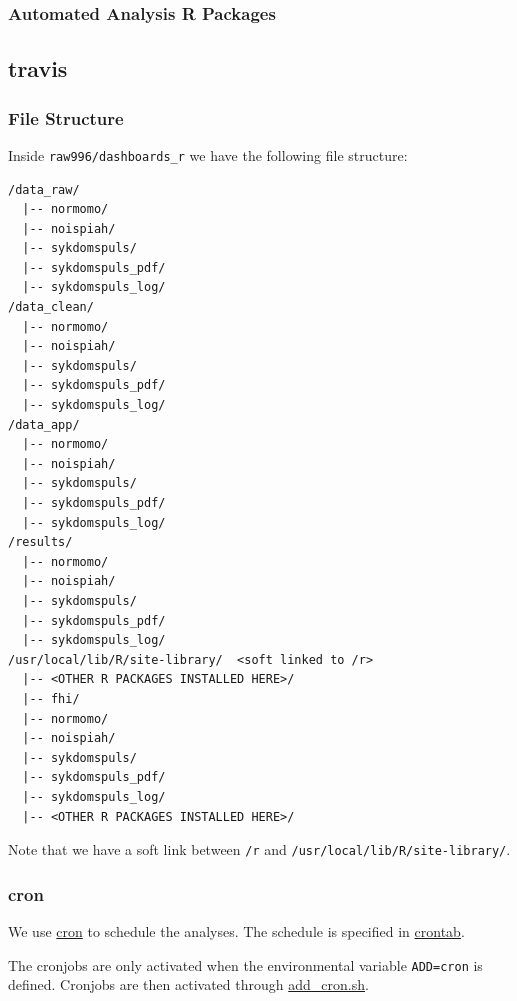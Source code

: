 \documentclass[12pt,]{article}
\begin{document}
\subsubsection{Automated Analysis R
Packages}\label{automated-analysis-r-packages}

\subsection{travis}\label{travis}

\hypertarget{internalfilestructure}{\subsubsection{File
Structure}\label{internalfilestructure}}

Inside \texttt{raw996/dashboards\_r} we have the following file
structure:

\begin{verbatim}
/data_raw/
  |-- normomo/
  |-- noispiah/
  |-- sykdomspuls/
  |-- sykdomspuls_pdf/
  |-- sykdomspuls_log/
/data_clean/
  |-- normomo/
  |-- noispiah/
  |-- sykdomspuls/
  |-- sykdomspuls_pdf/
  |-- sykdomspuls_log/
/data_app/
  |-- normomo/
  |-- noispiah/
  |-- sykdomspuls/
  |-- sykdomspuls_pdf/
  |-- sykdomspuls_log/
/results/
  |-- normomo/
  |-- noispiah/
  |-- sykdomspuls/
  |-- sykdomspuls_pdf/
  |-- sykdomspuls_log/
/usr/local/lib/R/site-library/  <soft linked to /r>
  |-- <OTHER R PACKAGES INSTALLED HERE>/
  |-- fhi/
  |-- normomo/
  |-- noispiah/
  |-- sykdomspuls/
  |-- sykdomspuls_pdf/
  |-- sykdomspuls_log/
  |-- <OTHER R PACKAGES INSTALLED HERE>/
\end{verbatim}

Note that we have a soft link between \texttt{/r} and
\texttt{/usr/local/lib/R/site-library/}.

\hypertarget{cron}{\subsubsection{cron}\label{cron}}

We use \href{https://en.wikipedia.org/wiki/Cron}{cron} to schedule the
analyses. The schedule is specified in
\href{https://github.com/raubreywhite/dashboards_control/blob/master/infrastructure/dashboards_r/crontab}{crontab}.

The cronjobs are only activated when the environmental variable
\texttt{ADD=cron} is defined. Cronjobs are then activated through
\href{https://github.com/raubreywhite/dashboards_control/blob/master/infrastructure/dashboards_r/add_cron.sh}{add\_cron.sh}.
\end{document}
